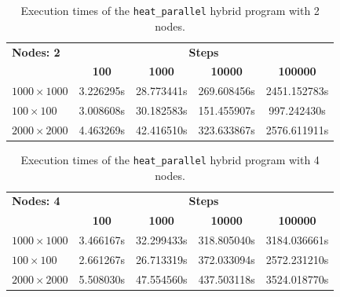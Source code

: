 \documentclass[12pt]{article}
\begin{document}
\newpage
\begin{table}[h!]
	\centering
	\begin{tabular}{lcccc}
		\hline
		\textbf{Nodes: 2} & \multicolumn{4}{c}{\textbf{Steps}}                                                    \\
		\cline{2-5}
		                  & \textbf{100}                       & \textbf{1000} & \textbf{10000} & \textbf{100000} \\
		\hline
		$1000\times 1000$ & 3.226295s                          & 28.773441s    & 269.608456s    & 2451.152783s    \\
		$100\times 100$   & 3.008608s                          & 30.182583s    & 151.455907s    & 997.242430s     \\
		$2000\times 2000$ & 4.463269s                          & 42.416510s    & 323.633867s    & 2576.611911s    \\
		\hline
	\end{tabular}
	\caption{Execution times of the \texttt{heat\_parallel} hybrid program with 2 nodes.}
	\label{tab:mpi_times_2_nodes}
\end{table}

\begin{table}[h!]
	\centering
	\begin{tabular}{lcccc}
		\hline
		\textbf{Nodes: 4} & \multicolumn{4}{c}{\textbf{Steps}}                                                    \\
		\cline{2-5}
		                  & \textbf{100}                       & \textbf{1000} & \textbf{10000} & \textbf{100000} \\
		\hline
		$1000\times 1000$ & 3.466167s                          & 32.299433s    & 318.805040s    & 3184.036661s    \\
		$100\times 100$   & 2.661267s                          & 26.713319s    & 372.033094s    & 2572.231210s    \\
		$2000\times 2000$ & 5.508030s                          & 47.554560s    & 437.503118s    & 3524.018770s    \\
		\hline
	\end{tabular}
	\caption{Execution times of the \texttt{heat\_parallel} hybrid program with 4 nodes.}
	\label{tab:mpi_times_4_nodes}
\end{table}
\end{document}
